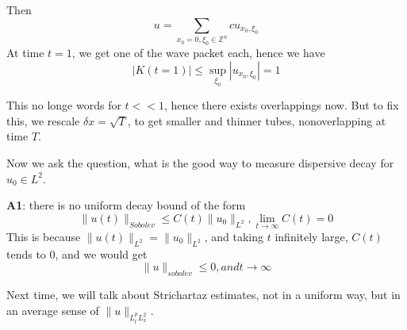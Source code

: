 Then
\begin{equation*}
    u=\sum_{x_0=0,\xi_0\in\mathbb{Z}^n}c u_{x_0, \xi_0}
\end{equation*}
At time $t=1$, we get one of the wave packet each, hence we have
\begin{equation*}
    |K(t=1)|\leq \sup_{\xi_0}|u_{x_0,\xi_0}|=1
\end{equation*}
\begin{remark}
    This no longe words for $t<<1$, hence there exists overlappings now. But to fix this, we rescale $\delta x=\sqrt{T}$, to get smaller and thinner tubes, nonoverlapping at time $T$.
\end{remark}

Now we ask the question, what is the good way to measure dispersive decay for $u_0\in L^2$.

\textbf{A1}: there is no uniform decay bound of the form
\begin{equation*}
    \|u(t)\|_{Sobolev}\leq C(t)\|u_0\|_{L^2}, \lim_{t\to\infty}C(t)=0
\end{equation*}
This is because $\|u(t)\|_{L^2}=\|u_0\|_{L^2}$, and taking $t$ infinitely large, $C(t)$ tends to 0, and we would get 
\begin{equation*}
    \|u\|_{sobolev}\leq 0, and t\to\infty
\end{equation*}

Next time, we will talk about Strichartaz estimates, not in a uniform way, but in an average sense of $\|u\|_{L_t^pL_x^2}$. 
